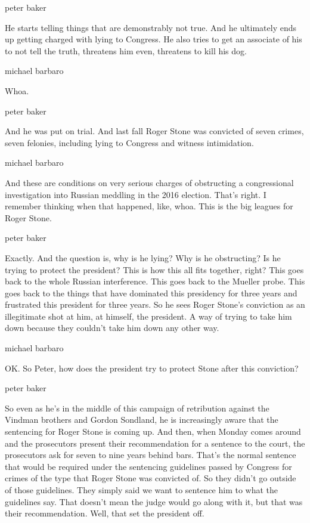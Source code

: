 peter baker

He starts telling things that are demonstrably not true. And he
ultimately ends up getting charged with lying to Congress. He also tries
to get an associate of his to not tell the truth, threatens him even,
threatens to kill his dog.

michael barbaro

Whoa.

peter baker

And he was put on trial. And last fall Roger Stone was convicted of
seven crimes, seven felonies, including lying to Congress and witness
intimidation.

michael barbaro

And these are conditions on very serious charges of obstructing a
congressional investigation into Russian meddling in the 2016 election.
That's right. I remember thinking when that happened, like, whoa. This
is the big leagues for Roger Stone.

peter baker

Exactly. And the question is, why is he lying? Why is he obstructing? Is
he trying to protect the president? This is how this all fits together,
right? This goes back to the whole Russian interference. This goes back
to the Mueller probe. This goes back to the things that have dominated
this presidency for three years and frustrated this president for three
years. So he sees Roger Stone's conviction as an illegitimate shot at
him, at himself, the president. A way of trying to take him down because
they couldn't take him down any other way.

michael barbaro

OK. So Peter, how does the president try to protect Stone after this
conviction?

peter baker

So even as he's in the middle of this campaign of retribution against
the Vindman brothers and Gordon Sondland, he is increasingly aware that
the sentencing for Roger Stone is coming up. And then, when Monday comes
around and the prosecutors present their recommendation for a sentence
to the court, the prosecutors ask for seven to nine years behind bars.
That's the normal sentence that would be required under the sentencing
guidelines passed by Congress for crimes of the type that Roger Stone
was convicted of. So they didn't go outside of those guidelines. They
simply said we want to sentence him to what the guidelines say. That
doesn't mean the judge would go along with it, but that was their
recommendation. Well, that set the president off.

